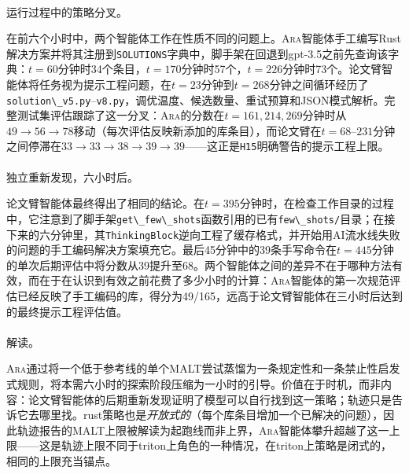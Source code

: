 \documentclass[
]{article}
\makeatletter
\let\oldparagraph\paragraph
\renewcommand{\paragraph}{
    \@ifstar
      \xxxParagraphStar
      \xxxParagraphNoStar
  }
\newcommand{\xxxParagraphStar}[1]{\oldparagraph*{#1}\mbox{}}
\newcommand{\xxxParagraphNoStar}[1]{\oldparagraph{#1}\mbox{}}
\newcommand{\passthrough}[1]{#1}
\theoremstyle{definition}
\newcommand{\ara}{\textsc{Ara}}
\makeatother
\begin{document}
\paragraph{运行过程中的策略分叉。}\label{ux8fd0ux884cux8fc7ux7a0bux4e2dux7684ux7b56ux7565ux5206ux53c9}

在前六个小时中，两个智能体工作在性质不同的问题上。\ara{}智能体手工编写Rust解决方案并将其注册到\passthrough{\lstinline!SOLUTIONS!}字典中，脚手架在回退到gpt-3.5之前先查询该字典：\(t = 60\)分钟时34个条目，\(t = 170\)分钟时57个，\(t = 226\)分钟时73个。论文臂智能体将任务视为提示工程问题，在\(t = 23\)分钟到\(t = 268\)分钟之间循环经历了\passthrough{\lstinline!solution\_v5.py!}--\passthrough{\lstinline!v8.py!}，调优温度、候选数量、重试预算和JSON模式解析。完整测试集评估跟踪了这一分叉：\ara{}的分数在\(t = 161, 214, 269\)分钟时从\(49 \to 56 \to 78\)移动（每次评估反映新添加的库条目），而论文臂在\(t = 68\)--\(231\)分钟之间停滞在\(33 \to 33 \to 38 \to 39 \to 39\)------这正是\passthrough{\lstinline!H15!}明确警告的提示工程上限。

\paragraph{独立重新发现，六小时后。}\label{ux72ecux7acbux91cdux65b0ux53d1ux73b0ux516dux5c0fux65f6ux540e}

论文臂智能体最终得出了相同的结论。在\(t = 395\)分钟时，在检查工作目录的过程中，它注意到了脚手架\passthrough{\lstinline!get\_few\_shots!}函数引用的已有\passthrough{\lstinline!few\_shots/!}目录；在接下来的六分钟里，其\passthrough{\lstinline!ThinkingBlock!}逆向工程了缓存格式，并开始用AI流水线失败的问题的手工编码解决方案填充它。最后45分钟中的39条手写命令在\(t = 445\)分钟的单次后期评估中将分数从39提升至68。两个智能体之间的差异不在于哪种方法有效，而在于在认识到有效之前花费了多少小时的计算：\ara{}智能体的第一次规范评估已经反映了手工编码的库，得分为49/165，远高于论文臂智能体在三小时后达到的最终提示工程评估值。

\paragraph{解读。}\label{ux89e3ux8bfb-1}

\ara{}通过将一个低于参考线的单个MALT尝试蒸馏为一条规定性和一条禁止性启发式规则，将本需六小时的探索阶段压缩为一小时的引导。价值在于时机，而非内容：论文臂智能体的后期重新发现证明了模型可以自行找到这一策略；轨迹只是告诉它去哪里找。rust策略也是\emph{开放式的}（每个库条目增加一个已解决的问题），因此轨迹报告的MALT上限被解读为起跑线而非上界，\ara{}智能体攀升超越了这一上限------这是轨迹上限不同于triton上角色的一种情况，在triton上策略是闭式的，相同的上限充当锚点。
\end{document}

